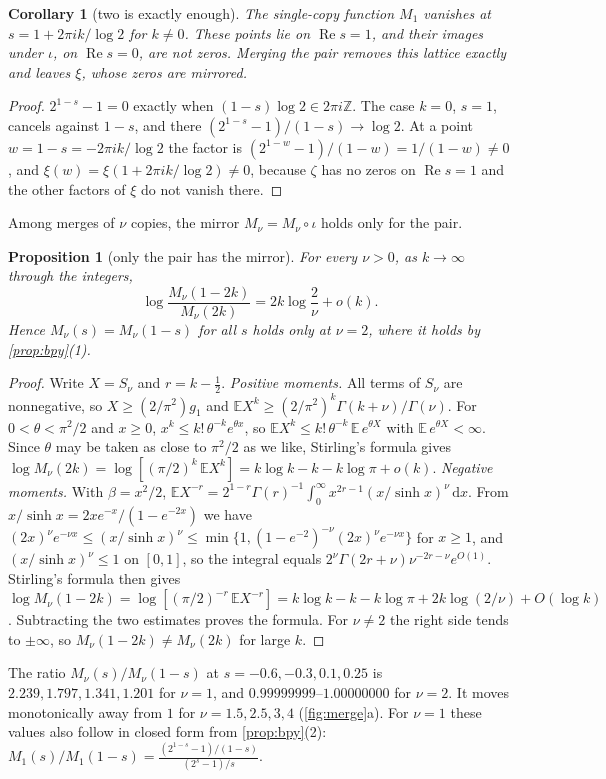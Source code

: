 \documentclass[11pt]{article}
\newtheorem{proposition}[theorem]{Proposition}
\newtheorem{corollary}[theorem]{Corollary}
\theoremstyle{definition}\newtheorem{definition}[theorem]{Definition}
\theoremstyle{remark}\newtheorem{remark}[theorem]{Remark}
\newcommand{\dd}{\,\mathrm d}\newcommand{\e}{\mathrm e}
\renewcommand{\Re}{\operatorname{Re}}\renewcommand{\Im}{\operatorname{Im}}
\begin{document}
\begin{corollary}[two is exactly enough]\label{cor:two}
The single-copy function $M_1$ vanishes at $s=1+2\pi ik/\log2$ for $k\neq0$. These points lie on $\Re s=1$, and their images under $\iota$, on $\Re s=0$, are not zeros. Merging the pair removes this lattice exactly and leaves $\xi$, whose zeros are mirrored.
\end{corollary}
\begin{proof}
$2^{1-s}-1=0$ exactly when $(1-s)\log2\in2\pi i\mathbb Z$. The case $k=0$, $s=1$, cancels against $1-s$, and there $(2^{1-s}-1)/(1-s)\to\log2$. At a point $w=1-s=-2\pi ik/\log2$ the factor is $(2^{1-w}-1)/(1-w)=1/(1-w)\ne0$, and $\xi(w)=\xi(1+2\pi ik/\log2)\ne0$, because $\zeta$ has no zeros on $\Re s=1$ \cite[Ch.~III]{Titchmarsh} and the other factors of $\xi$ do not vanish there.
\end{proof}
Among merges of $\nu$ copies, the mirror $M_\nu=M_\nu\circ\iota$ holds only for the pair.
\begin{proposition}[only the pair has the mirror]\label{prop:onlytwo}
For every $\nu>0$, as $k\to\infty$ through the integers,
\[
\log\frac{M_\nu(1-2k)}{M_\nu(2k)}=2k\log\frac2\nu+o(k).
\]
Hence $M_\nu(s)=M_\nu(1-s)$ for all $s$ holds only at $\nu=2$, where it holds by \cref{prop:bpy}(1).
\end{proposition}
\begin{proof}
Write $X=S_\nu$ and $r=k-\frac12$. \emph{Positive moments.} All terms of $S_\nu$ are nonnegative, so $X\ge(2/\pi^2)g_1$ and $\mathbb E X^k\ge(2/\pi^2)^k\Gamma(k+\nu)/\Gamma(\nu)$. For $0<\theta<\pi^2/2$ and $x\ge0$, $x^k\le k!\,\theta^{-k}e^{\theta x}$, so $\mathbb E X^k\le k!\,\theta^{-k}\,\mathbb E\,e^{\theta X}$ with $\mathbb E\,e^{\theta X}<\infty$. Since $\theta$ may be taken as close to $\pi^2/2$ as we like, Stirling's formula gives $\log M_\nu(2k)=\log[(\pi/2)^k\,\mathbb E X^k]=k\log k-k-k\log\pi+o(k)$. \emph{Negative moments.} With $\beta=x^2/2$, $\mathbb E X^{-r}=2^{1-r}\Gamma(r)^{-1}\int_0^\infty x^{2r-1}(x/\sinh x)^\nu\dd x$. From $x/\sinh x=2xe^{-x}/(1-e^{-2x})$ we have $(2x)^\nu e^{-\nu x}\le(x/\sinh x)^\nu\le\min\{1,(1-e^{-2})^{-\nu}(2x)^\nu e^{-\nu x}\}$ for $x\ge1$, and $(x/\sinh x)^\nu\le1$ on $[0,1]$, so the integral equals $2^\nu\Gamma(2r+\nu)\nu^{-2r-\nu}e^{O(1)}$. Stirling's formula then gives $\log M_\nu(1-2k)=\log[(\pi/2)^{-r}\,\mathbb E X^{-r}]=k\log k-k-k\log\pi+2k\log(2/\nu)+O(\log k)$. Subtracting the two estimates proves the formula. For $\nu\ne2$ the right side tends to $\pm\infty$, so $M_\nu(1-2k)\ne M_\nu(2k)$ for large $k$.
\end{proof}
The ratio $M_\nu(s)/M_\nu(1-s)$ at $s=-0.6,-0.3,0.1,0.25$ is $2.239,1.797,1.341,1.201$ for $\nu=1$, and $0.99999999$--$1.00000000$ for $\nu=2$. It moves monotonically away from $1$ for $\nu=1.5,2.5,3,4$ (\cref{fig:merge}a). For $\nu=1$ these values also follow in closed form from \cref{prop:bpy}(2): $M_1(s)/M_1(1-s)=\frac{(2^{1-s}-1)/(1-s)}{(2^{s}-1)/s}$.
\end{document}

